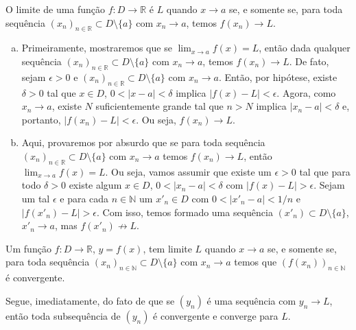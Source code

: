 \begin{teo}\label{teo:limites_e_sequencias}
  O limite de uma função $f:D\to\mathbb{R}$ é $L$ quando $x\to a$ se, e somente se, para toda sequência $(x_n)_{n\in\mathbb{R}}\subset D\setminus\{a\}$ com $x_n\to a$, temos $f(x_n)\to L$.
\end{teo}
\begin{dem}
  \begin{enumerate}[a)]
  \item Primeiramente, mostraremos que se $\lim_{x\to a}f(x) = L$, então dada qualquer sequência $(x_n)_{n\in\mathbb{R}}\subset D\setminus\{a\}$ com $x_n\to a$, temos $f(x_n)\to L$. De fato, sejam $\epsilon>0$ e $(x_n)_{n\in\mathbb{R}}\subset D\setminus\{a\}$ com $x_n\to a$. Então, por hipótese, existe $\delta>0$ tal que $x\in D$, $0<|x-a|<\delta$ implica $|f(x)-L|<\epsilon$. Agora, como $x_n\to a$, existe $N$ suficientemente grande tal que $n>N$ implica $|x_n-a|<\delta$ e, portanto, $|f(x_n)-L|<\epsilon$. Ou seja, $f(x_n)\to L$.
  \item Aqui, provaremos por absurdo que se para toda sequência $(x_n)_{n\in\mathbb{R}}\subset D\setminus\{a\}$ com $x_n\to a$ temos $f(x_n)\to L$, então $\lim_{x\to a}f(x)=L$. Ou seja, vamos assumir que existe um $\epsilon>0$ tal que para todo $\delta>0$ existe algum $x\in D$, $0<|x_n-a|<\delta$ com $|f(x)-L|>\epsilon$. Sejam um tal $\epsilon$ e para cada $n\in\mathbb{N}$ um $x'_n\in D$ com $0<|x'_n-a|<1/n$ e $|f(x'_n)-L|>\epsilon$. Com isso, temos formado uma sequência $(x'_n)\subset D\setminus\{a\}$, $x'_n\to a$, mas $f(x'_n) \not\to L$.
  \end{enumerate}
\end{dem}

\begin{corol}\label{corol:limites_de_funcoes_e_sequencias}
  Um função $f:D\to\mathbb{R}$, $y=f(x)$, tem limite $L$ quando $x\to a$ se, e somente se, para toda sequência $(x_n)_{n\in\mathbb{N}}\subset D\setminus\{a\}$ com $x_n\to a$ temos que $\left(f(x_n)\right)_{n\in\mathbb{N}}$ é convergente.
\end{corol}
\begin{dem}
  Segue, imediatamente, do fato de que se $(y_n)$ é uma sequência com $y_n\to L$, então toda subsequência de $(y_n)$ é convergente e converge para $L$.
\end{dem}

